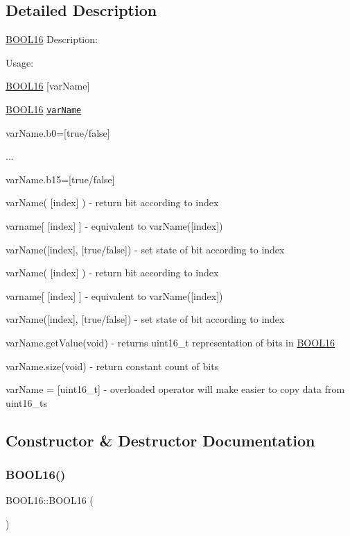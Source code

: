 \subsection{Detailed Description}
\hyperlink{struct_b_o_o_l16}{B\+O\+O\+L16} Description\+:

Usage\+:

\hyperlink{struct_b_o_o_l16}{B\+O\+O\+L16} \mbox{[}var\+Name\mbox{]}

\hyperlink{struct_b_o_o_l16}{B\+O\+O\+L16} \href{b0,...,b7}{\tt var\+Name}

var\+Name.\+b0=\mbox{[}true/false\mbox{]}

...

var\+Name.\+b15=\mbox{[}true/false\mbox{]}

var\+Name( \mbox{[}index\mbox{]} ) -\/ return bit according to index

varname\mbox{[} \mbox{[}index\mbox{]} \mbox{]} -\/ equivalent to var\+Name(\mbox{[}index\mbox{]})

var\+Name(\mbox{[}index\mbox{]}, \mbox{[}true/false\mbox{]}) -\/ set state of bit according to index

var\+Name( \mbox{[}index\mbox{]} ) -\/ return bit according to index

varname\mbox{[} \mbox{[}index\mbox{]} \mbox{]} -\/ equivalent to var\+Name(\mbox{[}index\mbox{]})

var\+Name(\mbox{[}index\mbox{]}, \mbox{[}true/false\mbox{]}) -\/ set state of bit according to index

var\+Name.\+get\+Value(void) -\/ returns uint16\+\_\+t representation of bits in \hyperlink{struct_b_o_o_l16}{B\+O\+O\+L16}

var\+Name.\+size(void) -\/ return constant count of bits

var\+Name = \mbox{[}uint16\+\_\+t\mbox{]} -\/ overloaded operator will make easier to copy data from uint16\+\_\+ts 

\subsection{Constructor \& Destructor Documentation}
\hypertarget{struct_b_o_o_l16_aa6177ab6503ebcdd2d2a7899feeef548}{}\label{struct_b_o_o_l16_aa6177ab6503ebcdd2d2a7899feeef548} 
\subsubsection{\texorpdfstring{B\+O\+O\+L16()}{BOOL16()}\hspace{0.1cm}{\footnotesize\ttfamily [1/2]}}
{\footnotesize\ttfamily B\+O\+O\+L16\+::\+B\+O\+O\+L16 (\begin{DoxyParamCaption}{ }\end{DoxyParamCaption})\hspace{0.3cm}{\ttfamily [default]}}

